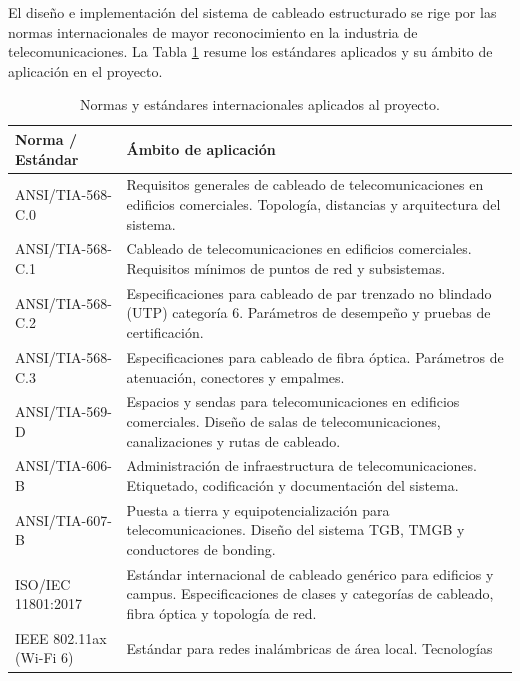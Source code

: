 El diseño e implementación del sistema de cableado estructurado se rige por las
normas internacionales de mayor reconocimiento en la industria de
telecomunicaciones. La Tabla \ref{tab:normas} resume los estándares aplicados
y su ámbito de aplicación en el proyecto.

\begin{table}[H]
    \centering
    \caption{Normas y estándares internacionales aplicados al proyecto.}
    \label{tab:normas}
    \begin{tabular}{|p{4.5cm}|p{9cm}|}
        \hline
        \textbf{Norma / Estándar} & \textbf{Ámbito de aplicación} \\
        \hline
        ANSI/TIA-568-C.0 &
        Requisitos generales de cableado de telecomunicaciones en edificios
        comerciales. Topología, distancias y arquitectura del sistema. \\
        \hline
        ANSI/TIA-568-C.1 &
        Cableado de telecomunicaciones en edificios comerciales.
        Requisitos mínimos de puntos de red y subsistemas. \\
        \hline
        ANSI/TIA-568-C.2 &
        Especificaciones para cableado de par trenzado no blindado (UTP)
        categoría 6. Parámetros de desempeño y pruebas de certificación. \\
        \hline
        ANSI/TIA-568-C.3 &
        Especificaciones para cableado de fibra óptica. Parámetros de
        atenuación, conectores y empalmes. \\
        \hline
        ANSI/TIA-569-D &
        Espacios y sendas para telecomunicaciones en edificios comerciales.
        Diseño de salas de telecomunicaciones, canalizaciones y rutas de
        cableado. \\
        \hline
        ANSI/TIA-606-B &
        Administración de infraestructura de telecomunicaciones.
        Etiquetado, codificación y documentación del sistema. \\
        \hline
        ANSI/TIA-607-B &
        Puesta a tierra y equipotencialización para telecomunicaciones.
        Diseño del sistema TGB, TMGB y conductores de bonding. \\
        \hline
        ISO/IEC 11801:2017 &
        Estándar internacional de cableado genérico para edificios y
        campus. Especificaciones de clases y categorías de cableado,
        fibra óptica y topología de red. \\
        \hline
        IEEE 802.11ax (Wi-Fi 6) &
        Estándar para redes inalámbricas de área local. Tecnologías

\end{tabular}
\end{table}
